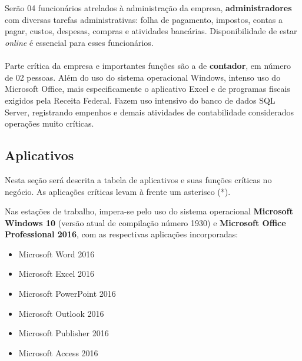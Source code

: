 \documentclass[	DIV=calc,%
							paper=a4,%
							fontsize=12pt,%
							onecolumn]{scrartcl}	 					%
\begin{document}
\\ \\
Serão 04 funcionários atrelados à administração da empresa, \textbf{administradores} com diversas tarefas administrativas: folha de pagamento, impostos, contas a pagar, custos, despesas, compras e atividades bancárias. Disponibilidade de estar \textit{online} é essencial para esses funcionários.
\\ \\
Parte crítica da empresa e importantes funções são a de \textbf{contador}, em número de 02 pessoas. Além do uso do sistema operacional Windows, intenso uso do Microsoft Office, mais especificamente o aplicativo Excel e de programas fiscais exigidos pela Receita Federal. Fazem uso intensivo do banco de dados SQL Server, registrando empenhos e demais atividades de contabilidade considerados operações muito críticas.


\pagebreak
\subsection{Aplicativos}

Nesta seção será descrita a tabela de aplicativos e suas funções críticas no negócio. As aplicações críticas levam à frente um asterisco (*).







Nas estações de trabalho, impera-se pelo uso do sistema operacional \textbf{Microsoft Windows 10} (versão atual de compilação número 1930) e \textbf{Microsoft Office Professional 2016}, com as respectivas aplicações incorporadas: \\ 

\begin{itemize}
	\item Microsoft Word 2016 
	\item Microsoft Excel 2016
	\item Microsoft PowerPoint 2016
	\item Microsoft Outlook 2016
	\item Microsoft Publisher 2016
	\item Microsoft Access 2016
\end{itemize}
\end{document}
